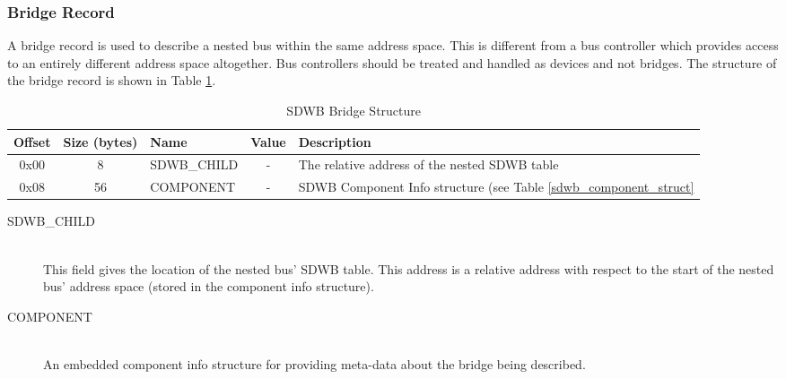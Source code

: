 \documentclass[a4paper, 12pt]{article}
\begin{document}
\subsubsection{Bridge Record}

A bridge record is used to describe a nested bus within the same address space. This is different from
a bus controller which provides access to an entirely different address space altogether. Bus
controllers should be treated and handled as devices and not bridges. The structure of the bridge record
is shown in Table \ref{sdwb_bridge_struct}.

\begin{center}
  \begin{savenotes}
    \begin{table}[!ht]\footnotesize
      \caption{SDWB Bridge Structure}\label{sdwb_bridge_struct}\centering
        \begin{tabular}{| c | c | l | c | p{5cm} |} \hline
        Offset & Size (bytes) & Name & Value & Description \\ \hline
        0x00 & 8 & SDWB\_CHILD & - & The relative address of the nested SDWB table \\ \hline
        0x08 & 56 & COMPONENT & - & SDWB Component Info structure (see Table \ref{sdwb_component_struct} \\ \hline
        \end{tabular}
    \end{table}
  \end{savenotes}
\end{center}

\begin{description}
\item[SDWB\_CHILD] \hfill \\
This field gives the location of the nested bus' SDWB table. This address is a relative address
with respect to the start of the nested bus' address space (stored in the component info structure).

\item[COMPONENT] \hfill \\
An embedded component info structure for providing meta-data about the bridge being described.
\end{description}
\end{document}
